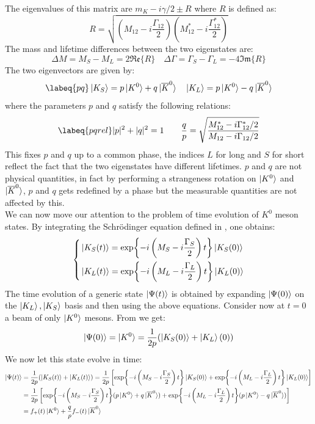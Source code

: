 \documentclass[../main.tex]{subfiles}
\begin{document}
The eigenvalues of this matrix are $m_K-i\gamma/2\pm R$ where $R$ is defined as:
\[
R=\sqrt{\left(M_{12}-i\frac{\Gamma_{12}}{2}\right)\left(M_{12}^*-i\frac{\Gamma_{12}^*}{2}\right)}
\]
The mass and lifetime differences between the two eigenstates are:
\[
\Delta M=M_S-M_L=2\mathfrak{Re}\{R\} \quad \Delta\Gamma=\Gamma_S-\Gamma_L=-4\mathfrak{Im}\{R\}
\]
The two eigenvectors are given by:
\begin{equation}
\labeq{pq}
\ket{K_S}=p\ket{K^0}+q\ket{\overline{K}^0} \quad \ket{K_L}=p\ket{K^0}-q\ket{\overline{K}^0}
\end{equation}
where the parameters $p$ and $q$ satisfy the following relations:
\begin{equation}
\labeq{pqrel}
|p|^2+|q|^2=1 \qquad \frac{q}{p}=\sqrt{\frac{M_{12}^*-i\Gamma_{12}^*/2}{M_{12}-i\Gamma_{12}/2}}
\end{equation}
This fixes $p$ and $q$ up to a common phase, the indices $L$ for long and $S$ for short reflect the fact that the two eigenstates have different lifetimes. $p$ and $q$ are not physical quantities, in fact by performing a strangeness rotation on $\ket{K^0}$ and $\ket{\overline{K}^0}$, $p$ and $q$ gets redefined by a phase but the measurable quantities are not affected by this.\\
We can now move our attention to the problem of time evolution of $K^0$ meson states. By integrating the Schr\"odinger equation defined in , one obtains:
\[
\left\{
\begin{aligned}
&\ket{K_S(t)}=\exp{-i\left(M_S-i\frac{\Gamma_S}{2}\right)t}\ket{K_S(0)}\\
&\ket{K_L(t)}=\exp{-i\left(M_L-i\frac{\Gamma_L}{2}\right)t}\ket{K_L(0)}
\end{aligned}
\right.
\]
The time evolution of a generic state $\ket{\Psi(t)}$ is obtained by expanding $\ket{\Psi(0)}$ on the $\ket{K_L}, \ket{K_S}$ basis and then using the above equations. Consider now at $t=0$ a beam of only $\ket{K^0}$ mesons. From  we get:
\[
\ket{\Psi(0)}=\ket{K^0}=\frac{1}{2p}(\ket{K_S(0)}+\ket{K_L}(0))
\]
We now let this state evolve in time:
\begin{align*}
\ket{\Psi(t)}&=\frac{1}{2p}(\ket{K_S(t)}+\ket{K_L(t)})=\frac{1}{2p}\left[\exp{-i\left(M_S-i\frac{\Gamma_S}{2}\right)t}\ket{K_S(0)}+\exp{-i\left(M_L-i\frac{\Gamma_L}{2}\right)t}\ket{K_L(0)}\right]\\
&=\frac{1}{2p}\left[\exp{-i\left(M_S-i\frac{\Gamma_S}{2}\right)t}(p\ket{K^0}+q\ket{\overline{K}^0})+\exp{-i\left(M_L-i\frac{\Gamma_L}{2}\right)t}(p\ket{K^0}-q\ket{\overline{K}^0})\right]\\
&=f_+(t)\ket{K^0}+\frac{q}{p}f_-(t)\ket{\overline{K}^0}
\end{align*}
\end{document}
